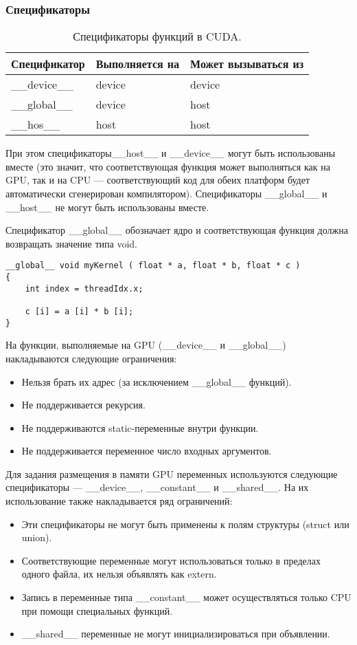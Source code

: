 \subsubsection{Спецификаторы}

\begin{table}[h]
\caption{\label{cudatypes} \small{Спецификаторы функций в CUDA.}}
\begin{center}
\begin{tabular}{|l|l|l|}
\hline
Спецификатор	&Выполняется на	&Может вызываться из \\
\hline
\_\_device\_\_	&device	&device\\
\hline
\_\_global\_\_	&device	&host\\
\hline
\_\_hos\_\_	&host	&host\\
\hline
\end{tabular}
\end{center}
\end{table} 

При этом спецификаторы\_\_host\_\_ и \_\_device\_\_ могут быть использованы вместе (это значит, что соответствующая функция может выполняться как на GPU, так и на CPU --- соответствующий код для обеих платформ будет автоматически сгенерирован компилятором). Спецификаторы \_\_global\_\_ и \_\_host\_\_ не могут быть использованы вместе.

Спецификатор \_\_global\_\_ обозначает ядро и соответствующая функция должна возвращать значение типа void.

\begin{verbatim}
__global__ void myKernel ( float * a, float * b, float * c )
{
    int index = threadIdx.x;
	
    c [i] = a [i] * b [i];
}
\end{verbatim}

На функции, выполняемые на GPU (\_\_device\_\_ и \_\_global\_\_) накладываются следующие ограничения:
\begin{itemize}
\item Нельзя брать их адрес (за исключением \_\_global\_\_ функций).
\item Не поддерживается рекурсия.
\item Не поддерживаются static-переменные внутри функции.
\item Не поддерживается переменное число входных аргументов.
\end{itemize}

Для задания размещения в памяти GPU переменных используются следующие спецификаторы --- \_\_device\_\_, \_\_constant\_\_ и \_\_shared\_\_. На их использование также накладывается ряд ограничений:
\begin{itemize}
\item Эти спецификаторы не могут быть применены к полям структуры (struct или union).
\item Соответствующие переменные могут использоваться только в пределах одного файла, их нельзя объявлять как extern.
\item Запись в переменные типа \_\_constant\_\_ может осуществляться только CPU при помощи специальных функций.
\item \_\_shared\_\_ переменные не могут инициализироваться при объявлении.
\end{itemize}

